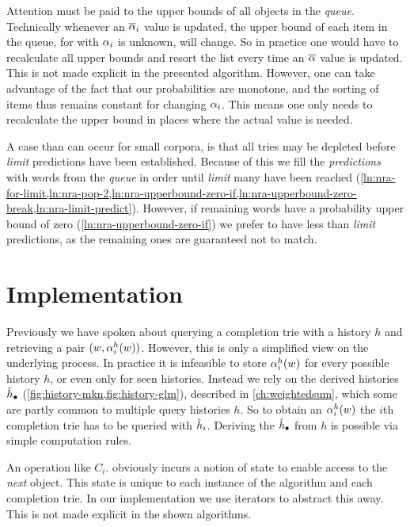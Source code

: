 Attention must be paid to the upper bounds of all objects in the \emph{queue}.
Technically whenever an $\overline{\alpha}_i$ value is updated, the upper bound
of each item in the queue, for with $\alpha_i$ is unknown, will change.
So in practice one would have to recalculate all upper bounds and resort the list
every time an $\overline{\alpha}$ value is updated.
This is not made explicit in the presented algorithm.
However, one can take advantage of the fact that our probabilities are monotone,
and the sorting of items thus remains constant for changing $\alpha_i$.
This means one only needs to recalculate the upper bound in places where the
actual value is needed.

A case than can occur for small corpora, is that all tries may be depleted
before \emph{limit} predictions have been established.
Because of this we fill the \emph{predictions} with words from the \emph{queue}
in order until \emph{limit} many have been reached
(\cref{ln:nra-for-limit,ln:nra-pop-2,ln:nra-upperbound-zero-if,ln:nra-upperbound-zero-break,ln:nra-limit-predict}).
However, if remaining words have a probability upper bound of zero
(\cref{ln:nra-upperbound-zero-if}) we prefer to have less than \emph{limit}
predictions, as the remaining ones are guaranteed not to match.

\clearpage
\section{Implementation}

Previously we have spoken about querying a completion trie with a history
$h$ and retrieving a pair $(w, \alpha^h_i(w))$.
However, this is only a simplified view on the underlying process.
In practice it is infeasible to store $\alpha^h_i(w)$ for every possible
history $h$, or even only for seen histories.
Instead we rely on the derived histories $\DerivedHistory[\DummyIndex]$
(\cref{fig:history-mkn,fig:history-glm}), described in \cref{ch:weightedsum},
which some are partly common to multiple query histories $h$.
So to obtain an $\alpha^h_i(w)$ the $i$th completion trie has to be queried with
$\DerivedHistory[i]$.
Deriving the $\DerivedHistory[\DummyIndex]$ from $h$ is possible via simple
computation rules.

An operation like $C_i$. obviously incurs a notion
of state to enable access to the \emph{next} object.
This state is unique to each instance of the algorithm and each completion trie.
In our implementation we use iterators to abstract this away.
This is not made explicit in the shown algorithms.

